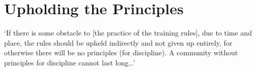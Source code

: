 
\ifhandbookedition
\vspace*{-\baselineskip}
\fi

\section{Upholding the Principles}

`If there is some obstacle to [the practice of the training rules], due to time
and place, the rules should be upheld indirectly and not given up entirely, for
otherwise there will be no principles (for discipline). A community without
principles for discipline cannot last long\ldots{}'


